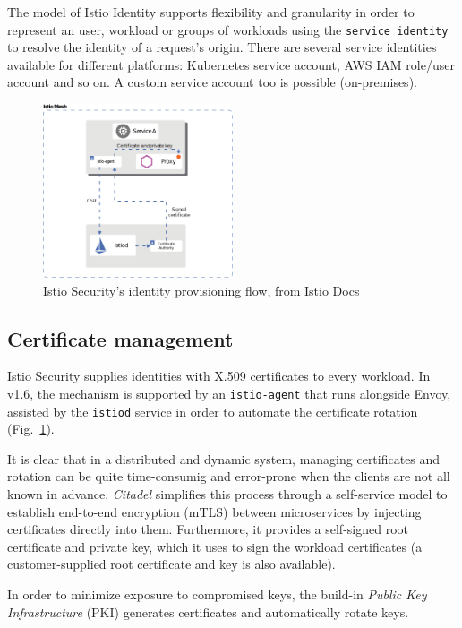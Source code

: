 The model of Istio Identity supports flexibility and granularity in order to represent an user, workload or groups of workloads using the \texttt{service identity} to resolve the identity of a request's origin.
There are several service identities available for different platforms: Kubernetes service account, AWS IAM role/user account and so on. A custom service account too is possible (on-premises).
\vspace{0.5cm}

\begin{figure}[ht]
    \centering
    \includegraphics[width=0.5\textwidth]{chapters/images/chp1/cert-prov.png}
    \caption{Istio Security's identity provisioning flow, from Istio Docs}
    \label{fig:idprov}
\end{figure}

\subsection{Certificate management}
Istio Security supplies identities with X.509 certificates to every workload. In v1.6, the mechanism is supported by an \texttt{istio-agent} that runs alongside Envoy, assisted by the \texttt{istiod} service in order to automate the certificate rotation (Fig.~\ref{fig:idprov}).

It is clear that in a distributed and dynamic system, managing certificates and rotation can be quite time-consumig and error-prone when the clients are not all known in advance. \textit{Citadel} simplifies this process through a self-service model to establish end-to-end encryption (mTLS) between microservices by injecting certificates directly into them. Furthermore, it provides a self-signed root certificate and private key, which it uses to sign the workload certificates (a customer-supplied root certificate and key is also available).

In order to minimize exposure to compromised keys, the build-in \textit{Public Key Infrastructure} (PKI) generates certificates and automatically rotate keys.

